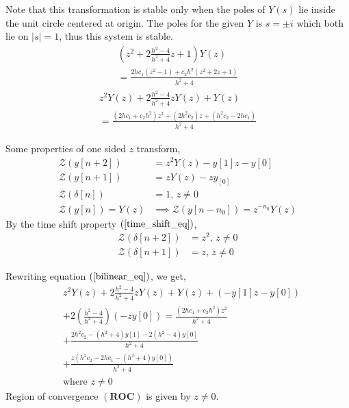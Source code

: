 \documentclass{beamer}
\providecommand{\sbrak}[1]{\ensuremath{{}\left[#1\right]}}
\providecommand{\brak}[1]{\ensuremath{\left(#1\right)}}
\theoremstyle{remark}
\providecommand{\abs}[1]{\left\vert#1\right\vert}
\numberwithin{equation}{section}
\begin{document}
\begin{frame}
    Note that this transformation is stable only when the poles of $Y\brak{s}$ lie inside the unit circle centered at origin. The poles for the given $Y$ is $s = \pm i$ which both lie on $\abs{s} = 1$, thus this system is stable.
\begin{multline}
    \brak{z^2 + 2\frac{h^2 - 4}{h^2 + 4}z + 1} Y\brak{z} \\
    = \frac{2hc_1 \brak{z^2 - 1} + c_2h^2 \brak{z^2 + 2z + 1}}{h^2 + 4}
\end{multline}
\begin{multline}
    z^2Y\brak{z} + 2\frac{h^2 - 4}{h^2 + 4}zY\brak{z} + Y\brak{z} \\
    = \frac{\brak{2h c_1 + c_2 h^2}z^2 + \brak{2h^2 c_2}z + \brak{h^2c_2 - 2hc_1}}{h^2 + 4} \label{bilinear_eq}
\end{multline}
\end{frame}

\begin{frame}
Some properties of one sided $z$ transform,
\begin{align}
    \mathcal{Z}\brak{y\sbrak{n + 2}} &= z^2 Y\brak{z} - y\sbrak{1}z - y\sbrak{0}\\
    \mathcal{Z}\brak{y\sbrak{n + 1}} &= z Y\brak{z} - z y_\sbrak{0}\\
    \mathcal{Z}\brak{\delta\sbrak{n}} &= 1 \text{, } z \neq 0\\
    \mathcal{Z}\brak{y\sbrak{n}} = Y\brak{z} &\implies \mathcal{Z}\brak{y\sbrak{n - n_0}} = z^{-n_0}Y\brak{z} \label{time_shift_eq}
\end{align}
By the time shift property $\brak{\ref{time_shift_eq}}$,
\begin{align}
    \mathcal{Z}\brak{\delta\sbrak{n + 2}} &= z^2 \text{, } z \neq 0\\
    \mathcal{Z}\brak{\delta\sbrak{n + 1}} &= z \text{, } z \neq 0
\end{align}
\end{frame}

\begin{frame}
Rewriting equation $\brak{\ref{bilinear_eq}}$, we get,
\begin{align}
    &z^2Y\brak{z} + 2\frac{h^2 - 4}{h^2 + 4}zY\brak{z} + Y\brak{z} + \brak{- y\sbrak{1}z - y\sbrak{0}} \nonumber\\
    &+ 2\brak{\frac{h^2 - 4}{h^2 + 4}}\brak{-zy\sbrak{0}} = \frac{\brak{2h c_1 + c_2 h^2}z^2}{h^2 + 4} \nonumber\\
    &+ \frac{2h^2 c_2 - \brak{h^2 + 4}y\sbrak{1} - 2\brak{h^2 - 4}y\sbrak{0}}{h^2 + 4} \nonumber\\
    &+ \frac{z\brak{h^2c_2 - 2hc_1 - \brak{h^2 + 4}y\sbrak{0}}}{h^2 + 4} \label{z_trans_eq}\\
    &\text{where } z \neq 0
\end{align}
Region of convergence $\brak{\textbf{ROC}}$ is given by $z \neq 0$.
\end{frame}
\end{document}
